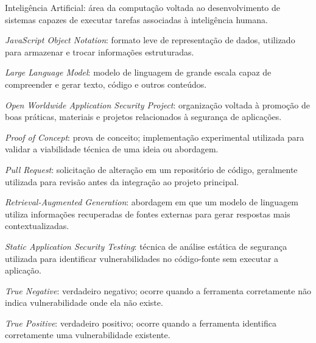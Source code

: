 \documentclass[
	12pt,					%
	openright,				%
	twoside,					%
	a4paper,					%
	english,					%
	brazil					%
	]{abntex2}
\begin{document}
\begin{siglas}
  \item[IA] Inteligência Artificial: área da computação voltada ao desenvolvimento de sistemas capazes de executar tarefas associadas à inteligência humana.
  
  \item[JSON] \textit{JavaScript Object Notation}: formato leve de representação de dados, utilizado para armazenar e trocar informações estruturadas.
  
  \item[LLM] \textit{Large Language Model}: modelo de linguagem de grande escala capaz de compreender e gerar texto, código e outros conteúdos.
  
  \item[OWASP] \textit{Open Worldwide Application Security Project}: organização voltada à promoção de boas práticas, materiais e projetos relacionados à segurança de aplicações.
  
  \item[PoC] \textit{Proof of Concept}: prova de conceito; implementação experimental utilizada para validar a viabilidade técnica de uma ideia ou abordagem.
  
  \item[PR] \textit{Pull Request}: solicitação de alteração em um repositório de código, geralmente utilizada para revisão antes da integração ao projeto principal.
  
  \item[RAG] \textit{Retrieval-Augmented Generation}: abordagem em que um modelo de linguagem utiliza informações recuperadas de fontes externas para gerar respostas mais contextualizadas.
  
  \item[SAST] \textit{Static Application Security Testing}: técnica de análise estática de segurança utilizada para identificar vulnerabilidades no código-fonte sem executar a aplicação.
  
  \item[TN] \textit{True Negative}: verdadeiro negativo; ocorre quando a ferramenta corretamente não indica vulnerabilidade onde ela não existe.
  
  \item[TP] \textit{True Positive}: verdadeiro positivo; ocorre quando a ferramenta identifica corretamente uma vulnerabilidade existente.
\end{siglas}



\tableofcontents*
\cleardoublepage
\end{document}
